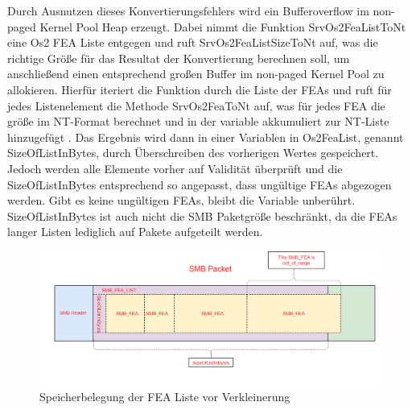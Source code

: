 \documentclass[DIV=12,headings=normal,pdftex,headinclude=false,footinclude=false,final]{scrreprt}
\begin{document}
\noindent
Durch Ausnutzen dieses Konvertierungsfehlers wird ein Bufferoverflow im non-paged Kernel Pool Heap erzeugt. Dabei nimmt die Funktion SrvOs2FeaListToNt eine Os2 FEA Liste entgegen und ruft SrvOs2FeaListSizeToNt auf, was die richtige Größe für das Resultat der Konvertierung berechnen soll, um anschließend  einen entsprechend großen Buffer im non-paged Kernel Pool zu allokieren. Hierfür iteriert die Funktion durch die Liste der FEAs und ruft für jedes Listenelement die Methode SrvOs2FeaToNt auf, was für jedes FEA die größe im NT-Format berechnet und in der variable akkumuliert zur NT-Liste hinzugefügt \cite{TM:EB}. Das Ergebnis wird dann in einer Variablen in Os2FeaList, genannt SizeOfListInBytes, durch Überschreiben des vorherigen Wertes gespeichert. Jedoch werden alle Elemente vorher auf Validität überprüft und die SizeOfListInBytes entsprechend so angepasst, dass ungültige FEAs abgezogen werden. Gibt es keine ungültigen FEAs, bleibt die Variable unberührt. SizeOfListInBytes ist auch nicht die SMB Paketgröße beschränkt, da die FEAs langer Listen lediglich auf Pakete aufgeteilt werden\cite{CP}.

\begin{figure}[H]
    \centering
    \includegraphics[width=15cm]{checkpoint_before_shrink.png}
    \caption[FEAList vor Verkleinerung, Nadav Grossmann (Checkpoint Research),URL: \url{https://research.checkpoint.com/wp-content/uploads/2017/09/eternalblue4.png}]{Speicherbelegung der FEA Liste vor Verkleinerung}
    \label{img:fealist_before_shrinking}
\end{figure}
\end{document}
